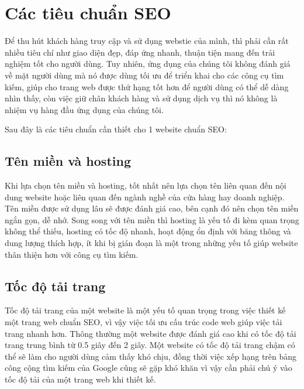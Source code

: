 \chapter{Các tiêu chuẩn SEO}
Để thu hút khách hàng truy cập và sử dụng webstie của mình, thì phải cần rất nhiều tiêu chí như giao diện đẹp, đáp ứng nhanh, thuận tiện mang đến trải nghiệm tốt cho người dùng. Tuy nhiên, ứng dụng của chúng tôi không đánh giá về mặt người dùng mà nó được dùng tối ưu để triển khai cho các công cụ tìm kiếm, giúp cho trang web được thứ hạng tốt hơn để người dùng có thể dễ dàng nhìn thấy, còn việc giữ chân khách hàng và sử dụng dịch vụ thì nó không là nhiệm vụ hàng đầu ứng dụng của chúng tôi.
\\\par
Sau đây là các tiêu chuẩn cần thiết cho 1 website chuẩn SEO\cite{seo}:
\section{Tên miền và hosting}
Khi lựa chọn tên miền và hosting, tốt nhất nên lựa chọn tên liên quan đến nội dung website hoặc liên quan đến ngành nghề của cửa hàng hay doanh nghiệp. Tên miền được sử dụng lâu sẽ được đánh giá cao, bên cạnh đó nên chọn tên miền ngắn gọn, dễ nhớ. Song song với tên miền thì hosting là yếu tố đi kèm quan trọng không thể thiếu, hosting có tốc độ nhanh, hoạt động ổn định với băng thông và dung lượng thích hợp, ít khi bị gián đoạn là một trong những yếu tố giúp website thân thiện hơn với công cụ tìm kiếm.
\section{Tốc độ tải trang}
Tốc độ tải trang của một website  là một yếu tố quan trọng trong việc thiết kế một trang web chuẩn SEO, vì vậy việc tối ưu cấu trúc code web giúp việc tải trang nhanh hơn. Thông thường một website được đánh giá cao khi có tốc độ tải trang trung bình từ 0.5 giây đến 2 giây. Một website có tốc độ tải trang chậm có thể sẽ làm cho người dùng cảm thấy khó chịu, đồng thời việc xếp hạng trên bảng công cộng tìm kiếm của Google cũng sẽ gặp khó khăn vì vậy cần phải chú ý vào tốc độ tải của một trang web khi thiết kế.
